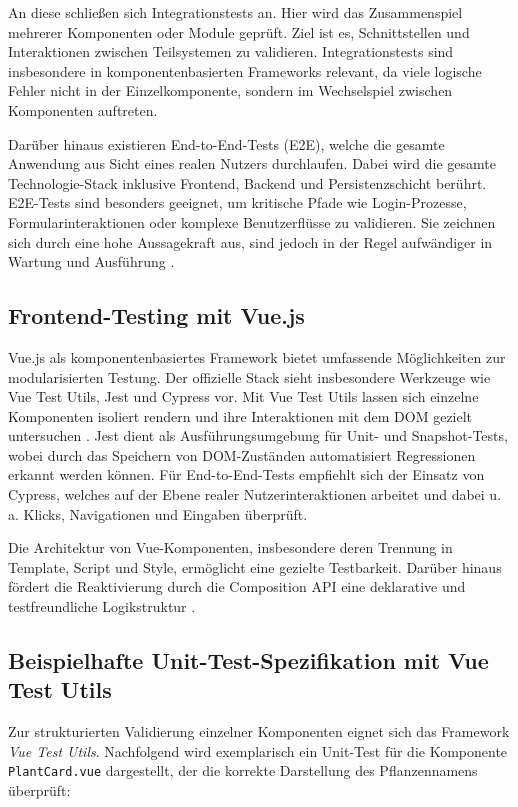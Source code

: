 An diese schließen sich Integrationstests an. Hier wird das Zusammenspiel mehrerer Komponenten oder Module geprüft. Ziel ist es, Schnittstellen und Interaktionen zwischen Teilsystemen zu validieren. Integrationstests sind insbesondere in komponentenbasierten Frameworks relevant, da viele logische Fehler nicht in der Einzelkomponente, sondern im Wechselspiel zwischen Komponenten auftreten.

Darüber hinaus existieren End-to-End-Tests (E2E), welche die gesamte Anwendung aus Sicht eines realen Nutzers durchlaufen. Dabei wird die gesamte Technologie-Stack inklusive Frontend, Backend und Persistenzschicht berührt. E2E-Tests sind besonders geeignet, um kritische Pfade wie Login-Prozesse, Formularinteraktionen oder komplexe Benutzerflüsse zu validieren. Sie zeichnen sich durch eine hohe Aussagekraft aus, sind jedoch in der Regel aufwändiger in Wartung und Ausführung \cite{Humble2010}.

\subsection{Frontend-Testing mit Vue.js}

Vue.js als komponentenbasiertes Framework bietet umfassende Möglichkeiten zur modularisierten Testung. Der offizielle Stack sieht insbesondere Werkzeuge wie Vue Test Utils, Jest und Cypress vor. Mit Vue Test Utils lassen sich einzelne Komponenten isoliert rendern und ihre Interaktionen mit dem DOM gezielt untersuchen \cite{VueTestUtils2024}. Jest dient als Ausführungsumgebung für Unit- und Snapshot-Tests, wobei durch das Speichern von DOM-Zuständen automatisiert Regressionen erkannt werden können. Für End-to-End-Tests empfiehlt sich der Einsatz von Cypress, welches auf der Ebene realer Nutzerinteraktionen arbeitet und dabei u.\,a. Klicks, Navigationen und Eingaben überprüft.

Die Architektur von Vue-Komponenten, insbesondere deren Trennung in Template, Script und Style, ermöglicht eine gezielte Testbarkeit. Darüber hinaus fördert die Reaktivierung durch die Composition API eine deklarative und testfreundliche Logikstruktur \cite{VueTestUtils2024}. 

\subsection{Beispielhafte Unit-Test-Spezifikation mit Vue Test Utils}

Zur strukturierten Validierung einzelner Komponenten eignet sich das Framework \emph{Vue Test Utils}. Nachfolgend wird exemplarisch ein Unit-Test für die Komponente \texttt{PlantCard.vue} dargestellt, der die korrekte Darstellung des Pflanzennamens überprüft:

